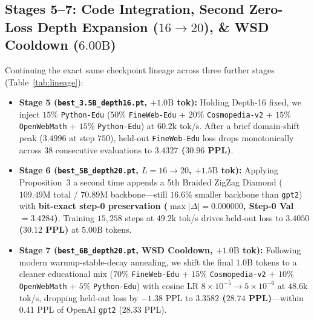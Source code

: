 \documentclass[10pt,twocolumn]{article}
\begin{document}
\subsection{Stages 5--7: Code Integration, Second Zero-Loss Depth Expansion ($16 \to 20$), \& WSD Cooldown ($6.00\text{B}$)}
Continuing the exact same checkpoint lineage across three further stages (Table~\ref{tab:lineage}):
\begin{itemize}
    \item \textbf{Stage 5 (\texttt{best\_3.5B\_depth16.pt}, $+1.0\text{B}$ tok):} Holding Depth-16 fixed, we inject $15\%$ \texttt{Python-Edu} ($50\%$ \texttt{FineWeb-Edu} + $20\%$ \texttt{Cosmopedia-v2} + $15\%$ \texttt{OpenWebMath} + $15\%$ \texttt{Python-Edu}) at $60.2\text{k}$ tok/s. After a brief domain-shift peak ($3.4996$ at step $750$), held-out \texttt{FineWeb-Edu} loss drops monotonically across 38 consecutive evaluations to \textbf{$3.4327$ ($30.96$ PPL)}.
    \item \textbf{Stage 6 (\texttt{best\_5B\_depth20.pt}, $L=16 \to 20$, $+1.5\text{B}$ tok):} Applying Proposition~3 a second time appends a 5th Braided ZigZag Diamond ($109.49\text{M}$ total / $70.89\text{M}$ backbone---still $16.6\%$ smaller backbone than \texttt{gpt2}) with \textbf{bit-exact step-0 preservation ($\max|\Delta|=0.000000$, Step-0 Val $= 3.4284$)}. Training $15{,}258$ steps at $49.2\text{k}$ tok/s drives held-out loss to \textbf{$3.4050$ ($30.12$ PPL)} at $5.00\text{B}$ tokens.
    \item \textbf{Stage 7 (\texttt{best\_6B\_depth20.pt}, WSD Cooldown, $+1.0\text{B}$ tok):} Following modern warmup-stable-decay annealing, we shift the final $1.0\text{B}$ tokens to a cleaner educational mix ($70\%$ \texttt{FineWeb-Edu} + $15\%$ \texttt{Cosmopedia-v2} + $10\%$ \texttt{OpenWebMath} + $5\%$ \texttt{Python-Edu}) with cosine LR $8{\times}10^{-5} \to 5{\times}10^{-6}$ at $48.6\text{k}$ tok/s, dropping held-out loss by $-1.38$ PPL to \textbf{$3.3582$ ($28.74$ PPL)}---within $0.41$ PPL of OpenAI \texttt{gpt2} ($28.33$ PPL).
\end{itemize}
\end{document}
